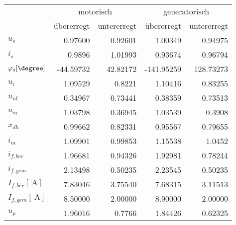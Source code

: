 \begin{table}[!ht]
	\centering%
    \begin{tabular}{|l|r|r|r|r|}
    \hline
                                  & \multicolumn{2}{c|}{motorisch} & \multicolumn{2}{c|}{generatorisch} \\
                                  & übererregt    & untererregt    & übererregt      & untererregt      \\ \hline
    $u_s$                         & 0.97600       & 0.92601        & 1.00349         & 0.94975          \\ \hline
    $i_s$                         & 0.9896        & 1.01993        & 0.93674         & 0.96794          \\ \hline
    $\varphi_s [\degree]$         & -44.59732     & 42.82172       & -141.95259      & 128.73273        \\ \hline
    $u_i$                         & 1.09529       & 0.8221         & 1.10416         & 0.83255          \\ \hline
    $u_{id}$                      & 0.34967       & 0.73441        & 0.38359         & 0.73513          \\ \hline
    $u_{iq}$                      & 1.03798       & 0.36945        & 1.03539         & 0.3908           \\ \hline
    $x_{dh}$                      & 0.99662       & 0.82331        & 0.95567         & 0.79655          \\ \hline
    $i_m$                         & 1.09901       & 0.99853        & 1.15538         & 1.0452           \\ \hline
    $i_{f,ber}$                   & 1.96681       & 0.94326        & 1.92981         & 0.78244          \\ \hline
    $i_{f,gem}$                   & 2.13498       & 0.50235        & 2.23545         & 0.50235          \\ \hline
    $I_{f,ber} [\SI{}{\ampere}]$  & 7.83046       & 3.75540        & 7.68315         & 3.11513          \\ \hline
    $I_{f,gem} [\SI{}{\ampere}]$  & 8.50000       & 2.00000        & 8.90000         & 2.00000          \\ \hline
    $u_p$                         & 1.96016       & 0.7766         & 1.84426         & 0.62325          \\ \hline

\end{tabular}
\end{table}
